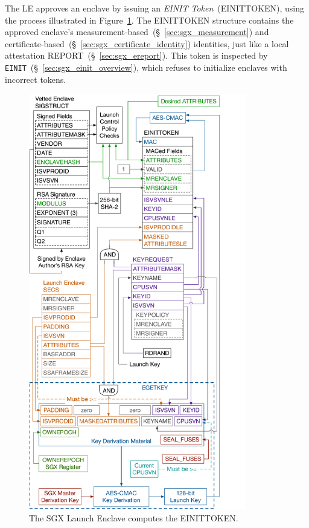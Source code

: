 The LE approves an enclave by issuing an \textit{EINIT Token}~(EINITTOKEN),
using the process illustrated in Figure~\ref{fig:sgx_einittoken}. The
EINITTOKEN structure contains the approved enclave's
measurement-based~(\S~\ref{sec:sgx_measurement}) and
certificate-based~(\S~\ref{sec:sgx_certificate_identity}) identities, just like
a local attestation REPORT~(\S~\ref{sec:sgx_ereport}). This token is inspected
by \texttt{EINIT}~(\S~\ref{sec:sgx_einit_overview}), which refuses to
initialize enclaves with incorrect tokens.

\begin{figure}[hbt!]
  \centering
  \includegraphics[width=95mm]{figures/sgx_einittoken.pdf}
  \caption{
    The SGX Launch Enclave computes the EINITTOKEN.
  }
  \label{fig:sgx_einittoken}
\end{figure}


